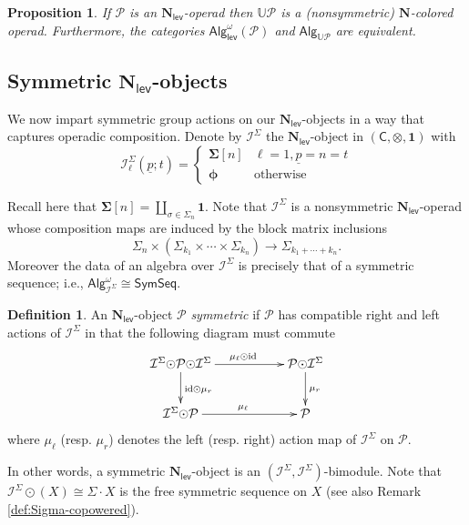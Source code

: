 \documentclass[11pt]{amsart}
\newtheorem{proposition}[subsection]{Proposition}
\theoremstyle{definition}
\newtheorem{definition}[subsection]{Definition}
\theoremstyle{remark}
\newcommand{\AlgN}[1]{\mathsf{Alg}^{\omega}_{\mathsf{lev}}\left(\mathcal{#1}\right)}
\newcommand{\SymSeq}{\mathsf{SymSeq}}
\newcommand{\id}{\mathrm{id}}
\newcommand{\Cal}[1]{\mathcal{#1}}
\newcommand{\circdot}{{\odot}}
\newcommand{\Nl}{\mathbf{N}_{\mathsf{lev}}}
\newcommand{\Isym}{\Cal{I}^{\Sigma}}
\newcommand{\ptC}{\pmb{\phi}}
\begin{document}
\begin{proposition}
If $\Cal{P}$ is an $\Nl$-operad then $\mathbb{U}\Cal{P}$ is a (nonsymmetric) $\mathbf{N}$-colored operad. Furthermore, the categories $\AlgN{P}$ and $\mathsf{Alg}_{\mathbb{U}\Cal{P}}$ are equivalent. 
\end{proposition}

\subsection{Symmetric $\Nl$-objects} We now impart symmetric group actions on our $\Nl$-objects in a way that captures operadic composition. Denote by $\Cal{I}^{\Sigma}$ the $\Nl$-object in $(\mathsf{C},\otimes, \mathbf{1})$ with \[\Cal{I}^{\Sigma}_{\ell}(\underline{p};t)=\begin{cases} 
    \mathbf{\Sigma}[n] & \ell=1, \underline{p}=n=t \\
    \ptC & \text{otherwise} 
    \end{cases}\] 
    
Recall here that $\mathbf{\Sigma}[n]=\coprod_{\sigma\in\Sigma_n} \mathbf{1}$. Note that $\Cal{I}^{\Sigma}$ is a nonsymmetric $\Nl$-operad whose composition maps are induced by the block matrix inclusions \[ \Sigma_n \times (\Sigma_{k_1}\times\cdots\times \Sigma_{k_n}) \to \Sigma_{k_1+\cdots+k_n}. \]  Moreover the data of an algebra over $\Isym$ is precisely that of a symmetric sequence; i.e.,  $\mathsf{Alg}^{\omega}_{\Cal{I}^{\Sigma}}\cong \SymSeq$. 

\begin{definition}
An $\Nl$-object $\Cal{P}$ \textit{symmetric} if $\Cal{P}$ has compatible right and left actions of $\Cal{I}^{\Sigma}$ in that the following diagram must commute \begin{equation*} 
    \xymatrix{
    \Isym\circdot \Cal{P} \circdot \Isym \ar[rr]^{\mu_{\ell}\circdot\id} \ar[d]^{\id\circdot \mu_{r}} && \Cal{P}\circdot \Isym \ar[d]^{\mu_r}
    \\
    \Isym\circdot \Cal{P} \ar[rr]^{\mu_{\ell}} && \Cal{P} }
\end{equation*}
where $\mu_{\ell}$ (resp. $\mu_r$) denotes the left (resp. right) action map of $\Isym$ on $\Cal{P}$. 
\end{definition}

In other words, a symmetric $\Nl$-object is an $(\Isym,\Isym)$-bimodule. Note that $\Isym \circdot(X)\cong \Sigma{\cdot} X$ is the free symmetric sequence on $X$ (see also Remark \ref{def:Sigma-copowered}).
\end{document}
